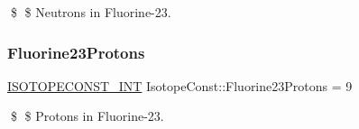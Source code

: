 \$ \$ Neutrons in Fluorine-\/23. \mbox{\label{group___isotope_const-_fluorine-_f23_gab5490ba703279839812127c08992ff94}} 
\subsubsection{\texorpdfstring{Fluorine23\+Protons}{Fluorine23Protons}}
{\footnotesize\ttfamily \mbox{\hyperlink{group___isotope_const-_macros_ga5f18360b3e99483a35c32d789e62621c}{I\+S\+O\+T\+O\+P\+E\+C\+O\+N\+S\+T\+\_\+\+I\+NT}} Isotope\+Const\+::\+Fluorine23\+Protons = 9}

\$ \$ Protons in Fluorine-\/23. 